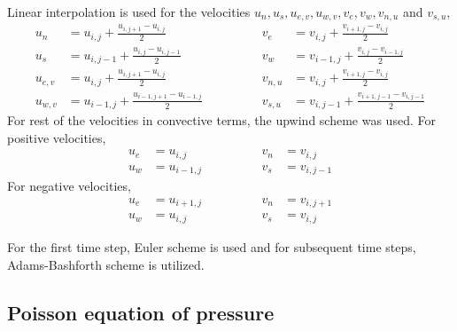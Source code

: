\documentclass[12pt,a4paper,fleqn]{article}
\begin{document}
Linear interpolation is used for the velocities \(u_n, u_s, u_{e,v}, u_{w,v}, v_e, v_w, v_{n,u}\) and \(v_{s,u}\),
\begin{equation*}
\begin{aligned}
u_n &= u_{i,j} + \frac{u_{i,j+1} - u_{i,j}}{2}\\
u_s &= u_{i,j-1} + \frac{u_{i,j} - u_{i,j-1}}{2}\\
u_{e,v} &= u_{i,j} + \frac{u_{i,j+1} - u_{i,j}}{2}\\
u_{w,v} &= u_{i-1,j} + \frac{u_{i-1,j+1} - u_{i-1,j}}{2}
\end{aligned}
\qquad\qquad
\begin{aligned}
v_e &= v_{i,j} + \frac{v_{i+1,j} - v_{i,j}}{2}\\
v_w &= v_{i-1,j} + \frac{v_{i,j} - v_{i-1,j}}{2}\\
v_{n,u} &= v_{i,j} + \frac{v_{i+1,j} - v_{i,j}}{2}\\
v_{s,u} &= v_{i,j-1} + \frac{v_{i+1,j-1} - v_{i,j-1}}{2}
\end{aligned}
\end{equation*}
For rest of the velocities in convective terms, the upwind scheme was used. For positive velocities,
\begin{equation*}
\begin{aligned}
u_e &= u_{i,j}\\
u_w &= u_{i-1,j}
\end{aligned}
\qquad\qquad
\begin{aligned}
v_n &= v_{i,j}\\
v_s &= v_{i,j-1}
\end{aligned}
\end{equation*}
For negative velocities,
\begin{equation*}
\begin{aligned}
u_e &= u_{i+1,j}\\
u_w &= u_{i,j}
\end{aligned}
\qquad\qquad
\begin{aligned}
v_n &= v_{i,j+1}\\
v_s &= v_{i,j}
\end{aligned}
\end{equation*}

For the first time step, Euler scheme is used and for subsequent time steps, Adams-Bashforth scheme is utilized.

\subsection{Poisson equation of pressure}
\end{document}

